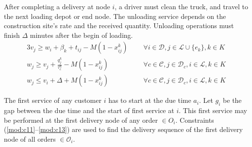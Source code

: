 \documentclass{article}
\begin{document}
After completing a delivery  at node $i$, a driver must clean the truck, and travel to the next loading depot or end node. The unloading service depends on the construction site's rate and the received quantity. Unloading operations must finish $\Delta$ minutes after the begin of loading.
\begin{alignat}{3}
    \label{mod:c7}     v_j \geq  w_i + \beta_{k} + t_{ij} - M\left(1-x^{k}_{ij}\right) & \text{ }& \forall i \in \mathcal{D}, j \in \mathcal{L} \cup \{e_k\},   k \in K \\
    \label{mod:c8}          w_{j} \geq v_{j}  + {  \frac{q^k_j}{\tau^u_c} -M\left(1- x^{k}_{ij}\right) } & \text{ }&  \forall c \in  \mathcal{C}, j \in \mathcal{D}_{c}, i \in \mathcal{L},  k \in K \\
    \label{mod:c31}          w_{j} \leq v_{i}  + \Delta + M\left(1- x^{k}_{ij}\right)&  \text{ }&  \forall c \in  \mathcal{C}, j \in \mathcal{D}_{c}, i \in \mathcal{L},  k \in K
\end{alignat}

The first service of any customer $i$ has to start at the due time $a_i$. Let $g_i$ be the gap between the due time and the start of first service at $i$. This first service may be performed at the first delivery node of any order $\in O_i$. Constraints (\ref{mod:c11}--\ref{mod:c13}) are used to find the delivery sequence of the first delivery node of all orders $\in \mathcal{O}_i$.
\end{document}
